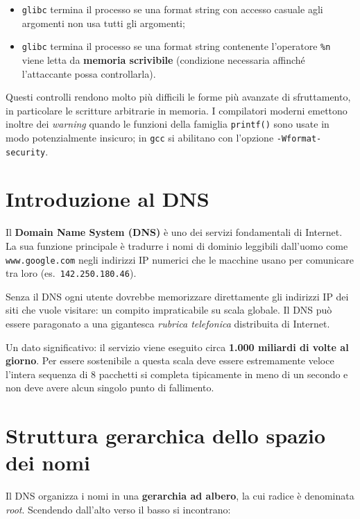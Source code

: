 \documentclass{article}
\begin{document}
\begin{itemize}
    \item \texttt{glibc} termina il processo se una format string con accesso casuale agli argomenti non usa tutti gli argomenti;
    \item \texttt{glibc} termina il processo se una format string contenente l'operatore \texttt{\%n} viene letta da \textbf{memoria scrivibile} (condizione necessaria affinché l'attaccante possa controllarla).
\end{itemize}

Questi controlli rendono molto più difficili le forme più avanzate di sfruttamento, in particolare le scritture arbitrarie in memoria. I compilatori moderni emettono inoltre dei \textit{warning} quando le funzioni della famiglia \texttt{printf()} sono usate in modo potenzialmente insicuro; in \texttt{gcc} si abilitano con l'opzione \texttt{-Wformat-security}.


\section{Introduzione al DNS}

Il \textbf{Domain Name System (DNS)} è uno dei servizi fondamentali di
Internet. La sua funzione principale è tradurre i nomi di dominio leggibili
dall'uomo come \texttt{www.google.com}  negli indirizzi IP numerici
che le macchine usano per comunicare tra loro (es.\ \texttt{142.250.180.46}).

Senza il DNS ogni utente dovrebbe memorizzare direttamente gli indirizzi IP
dei siti che vuole visitare: un compito impraticabile su scala globale. Il
DNS può essere paragonato a una gigantesca \emph{rubrica telefonica}
distribuita di Internet.

Un dato significativo: il servizio viene eseguito circa \textbf{1.000 miliardi
di volte al giorno}. Per essere sostenibile a questa scala deve essere
estremamente veloce l'intera sequenza di 8 pacchetti si completa
tipicamente in meno di un secondo e non deve avere alcun singolo punto
di fallimento.


\section*{Struttura gerarchica dello spazio dei nomi}

Il DNS organizza i nomi in una \textbf{gerarchia ad albero}, la cui radice
è denominata \emph{root}. Scendendo dall'alto verso il basso si incontrano:
\end{document}

